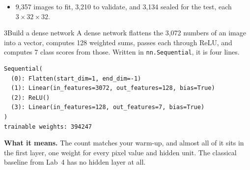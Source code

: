 \begin{labcheckpoint}
\begin{itemize}[leftmargin=1.2em,itemsep=2pt,topsep=1pt]
  \item 9,357 images to fit, 3,210 to validate, and 3,134 sealed for the test, each $3\times32\times32$.
\end{itemize}
\end{labcheckpoint}


\begin{labquestion}{3}{Build a dense network}
A dense network flattens the 3,072 numbers of an image into a vector, computes 128 weighted sums, passes each through ReLU, and computes 7 class scores from those. Written in \texttt{nn.Sequential}, it is four lines.
\end{labquestion}
\begin{labanswer}

\begin{refoutput}
\begin{lstlisting}[style=utpterminal]
Sequential(
  (0): Flatten(start_dim=1, end_dim=-1)
  (1): Linear(in_features=3072, out_features=128, bias=True)
  (2): ReLU()
  (3): Linear(in_features=128, out_features=7, bias=True)
)
trainable weights: 394247
\end{lstlisting}
\end{refoutput}

\textbf{What it means.} The count matches your warm-up, and almost all of it sits in the first layer, one weight for every pixel value and hidden unit. The classical baseline from Lab~4 has no hidden layer at all.
\end{labanswer}

